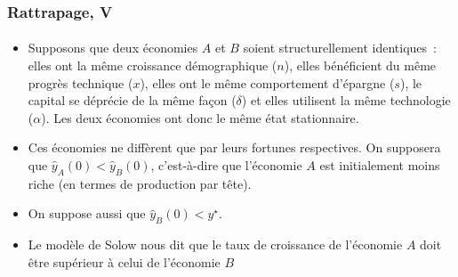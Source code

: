 \documentclass[10pt,notheorems]{beamer}
\theoremstyle{plain}
\theoremstyle{definition} %
\begin{document}
\begin{frame}
  \frametitle{Rattrapage, V}
  \framesubtitle{}

  \begin{itemize}

  \item Supposons que deux économies $A$ et $B$ soient structurellement
    identiques~: elles ont la même croissance démographique ($n$), elles
    bénéficient du même progrès technique ($x$), elles ont le même comportement
    d'épargne ($s$), le capital se déprécie de la même façon ($\delta$) et elles
    utilisent la même technologie ($\alpha$). Les deux économies ont donc le même
    état stationnaire.\newline

  \item Ces économies ne diffèrent que par leurs fortunes respectives. On
    supposera que $\hat y_A(0)<\hat y_B(0)$, c'est-à-dire que l'économie $A$ est
    initialement moins riche (en termes de production par tête).\newline

  \item On suppose aussi que $\hat y_B(0)<y^\star$.\newline

  \item Le modèle de Solow nous dit que le taux de croissance de l'économie $A$
    doit être supérieur à celui de l'économie $B$

  \end{itemize}

\end{frame}
\end{document}
